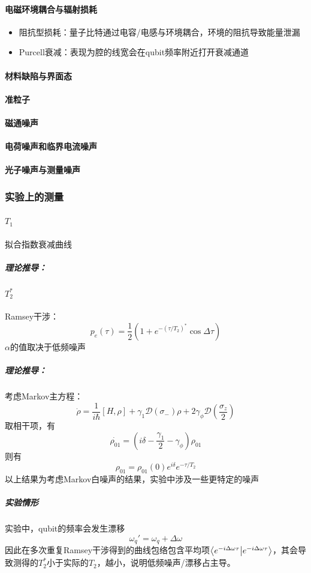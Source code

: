 \documentclass[12pt,a4paper,oneside]{ctexbook}
\let\oldparagraph\paragraph
\renewcommand{\paragraph}[1]{\oldparagraph{#1}\mbox{}}
\let\oldsubparagraph\subparagraph
\renewcommand{\subparagraph}[1]{\oldsubparagraph{#1}\mbox{}}
\begin{document}
\paragraph{电磁环境耦合与辐射损耗}
\begin{itemize}
  \item 阻抗型损耗：量子比特通过电容/电感与环境耦合，环境的阻抗导致能量泄漏
  \item Purcell衰减：表现为腔的线宽会在qubit频率附近打开衰减通道
\end{itemize}
\paragraph{材料缺陷与界面态}
\paragraph{准粒子}
\paragraph{磁通噪声}
\paragraph{电荷噪声和临界电流噪声}
\paragraph{光子噪声与测量噪声}

\subsubsection{实验上的测量}
\paragraph{$T_1$}
拟合指数衰减曲线
\subparagraph{理论推导：}

\paragraph{$T_2^*$}
Ramsey干涉：$$p_e(\tau) = \frac{1}{2}(1 + e^{-(\tau/T_2)^*}\cos \Delta \tau)$$
$\alpha$的值取决于低频噪声
\subparagraph{理论推导：}
考虑Markov主方程：$$\dot{\rho} = \frac{1}{i\hbar}[H,\rho] + \gamma_1 \mathcal{D}(\sigma_-)\rho + 2\gamma_{\phi} \mathcal{D}(\frac{\sigma_z}{2})$$
取相干项，有$$\dot{\rho_{01}} = (i\delta -\frac{\gamma_1}{2} - \gamma_{\phi})\rho_{01}$$
则有$$ \rho_{01} = \rho_{01}(0)e^{i\delta}e^{-\tau/T_2}$$
以上结果为考虑Markov白噪声的结果，实验中涉及一些更特定的噪声
\subparagraph{实验情形}
实验中，qubit的频率会发生漂移$$\omega_q' = \omega_q + \Delta \omega$$
因此在多次重复Ramsey干涉得到的曲线包络包含平均项$\braket{e^{-i\Delta \omega \tau}}$，其会导致测得的$T_2^*$小于实际的$T_2$，越小，说明低频噪声/漂移占主导。
\end{document}
